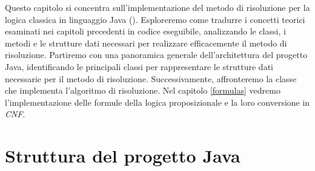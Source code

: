 \documentclass[a4paper,12pt]{report}
\begin{document}
Questo capitolo si concentra sull'implementazione del metodo di risoluzione per la logica classica in linguaggio Java (\cite{Java}). Esploreremo come tradurre i concetti teorici esaminati nei capitoli precedenti in codice eseguibile, analizzando le classi, i metodi e le strutture dati necessari per realizzare efficacemente il metodo di risoluzione. Partiremo con una panoramica generale dell'architettura del progetto Java, identificando le principali classi per rappresentare le strutture dati necessarie per il metodo di risoluzione. Successivamente, affronteremo la classe che implementa l'algoritmo di risoluzione. Nel capitolo \ref{formulas} vedremo l'implementazione delle formule della logica proposizionale e la loro conversione in \emph{CNF}.

\section{Struttura del progetto Java}
\label{project_structure}
\end{document}
